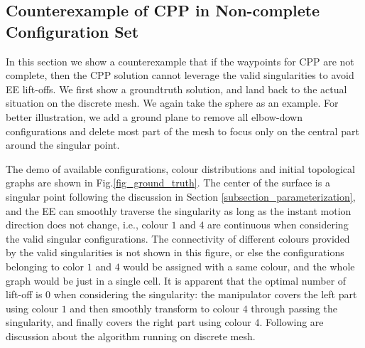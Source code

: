 \documentclass[Afour,sageh,times]{sagej}
\begin{document}
\subsection{Counterexample of CPP in Non-complete Configuration Set}
In this section we show a counterexample that if the waypoints for CPP are not complete, then the CPP solution cannot leverage the valid singularities to avoid EE lift-offs. We first show a groundtruth solution, and land back to the actual situation on the discrete mesh. 
We again take the sphere as an example. 
For better illustration, we add a ground plane to remove all elbow-down configurations and delete most part of the mesh to focus only on the central part around the singular point. 

The demo of available configurations, colour distributions and initial topological graphs are shown in Fig.\ref{fig_ground_truth}. 
The center of the surface is a singular point following the discussion in Section \ref{subsection_parameterization}, and the EE can smoothly traverse the singularity as long as the instant motion direction does not change, i.e., colour $1$ and $4$ are continuous when considering the valid singular configurations. 
The connectivity of different colours provided by the valid singularities is not shown in this figure, or else the configurations belonging to color $1$ and $4$ would be assigned with a same colour, and the whole graph would be just in a single cell. It is apparent that the optimal number of lift-off is $0$ when considering the singularity: the manipulator covers the left part using colour $1$ and then smoothly transform to colour $4$ through passing the singularity, and finally covers the right part using colour $4$. 
Following are discussion about the algorithm running on discrete mesh. 
\end{document}
